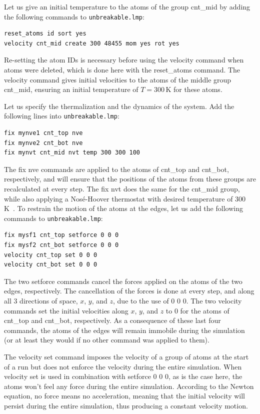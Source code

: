 \documentclass[9pt,tutorial]{livecoms}
\newcommand{\lmpcmd}[1]{\hspace{0pt}\colorbox{listing}{\textcolor{command}{\small{#1}}}\hspace{0pt}} %
\newcommand{\lmpcmdnote}[1]{\hspace{0pt}\colorbox{note_listing}{\textcolor{command}{\small{#1}}}\hspace{0pt}} %
\newcommand{\flecmd}[1]{\textcolor{command}{\texttt{#1}}} %
\begin{document}
Let us give an initial temperature to the atoms of the group \lmpcmd{cnt\_mid}
by adding the following commands to \flecmd{unbreakable.lmp}:
\begin{lstlisting}
reset_atoms id sort yes
velocity cnt_mid create 300 48455 mom yes rot yes
\end{lstlisting}
Re-setting the atom IDs is necessary before using the \lmpcmd{velocity} command
when atoms were deleted, which is done here with the \lmpcmd{reset\_atoms} command.
The \lmpcmd{velocity} command gives initial velocities to the atoms of the middle
group \lmpcmd{cnt\_mid}, ensuring an initial temperature of $T = 300\,\text{K}$
for these atoms.

Let us specify the thermalization and the dynamics of the system.  Add the following
lines into \flecmd{unbreakable.lmp}:
\begin{lstlisting}
fix mynve1 cnt_top nve
fix mynve2 cnt_bot nve
fix mynvt cnt_mid nvt temp 300 300 100
\end{lstlisting}
The \lmpcmd{fix nve} commands are applied to the atoms of \lmpcmd{cnt\_top} and
\lmpcmd{cnt\_bot}, respectively, and will ensure that the positions of the atoms
from these groups are recalculated at every step.  The \lmpcmd{fix nvt} does the
same for the \lmpcmd{cnt\_mid} group, while also applying a Nos\'e-Hoover thermostat
with desired temperature of 300\,K~\cite{nose1984unified, hoover1985canonical}.
To restrain the motion of the atoms at the edges, let us add the following
commands to \flecmd{unbreakable.lmp}:
\begin{lstlisting}
fix mysf1 cnt_top setforce 0 0 0
fix mysf2 cnt_bot setforce 0 0 0
velocity cnt_top set 0 0 0
velocity cnt_bot set 0 0 0
\end{lstlisting}
The two \lmpcmd{setforce} commands cancel the forces applied on the atoms of the
two edges, respectively.  The cancellation of the forces is done at every step,
and along all 3 directions of space, $x$, $y$, and $z$, due to the use of
\lmpcmd{0 0 0}.  The two \lmpcmd{velocity} commands set the initial velocities
along $x$, $y$, and $z$ to 0 for the atoms of \lmpcmd{cnt\_top} and
\lmpcmd{cnt\_bot}, respectively.  As a consequence of these last four commands,
the atoms of the edges will remain immobile during the simulation (or at least
they would if no other command was applied to them).

\begin{note}
The \lmpcmdnote{velocity set}
command imposes the velocity of a group of atoms at the start of a run but does
not enforce the velocity during the entire simulation.  When \lmpcmdnote{velocity set}
is used in combination with \lmpcmdnote{setforce 0 0 0}, as is the case here, the
atoms won't feel any force during the entire simulation.  According to the Newton
equation, no force means no acceleration, meaning that the initial velocity
will persist during the entire simulation, thus producing a constant velocity motion.
\end{note}
\end{document}
